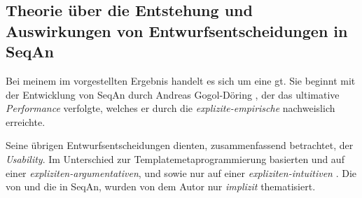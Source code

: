 \subsection{Theorie über die Entstehung und Auswirkungen von Entwurfsentscheidungen in SeqAn}

Bei meinem im  vorgestellten Ergebnis handelt es sich um eine \gls{gt}. Sie beginnt mit der Entwicklung von SeqAn durch Andreas Gogol-Döring \citep{GogolDoring:2009vz}, der das ultimative  \textit{Performance} verfolgte, welches er durch die \textit{explizite-empirische}   nachweislich erreichte.

Seine übrigen Entwurfsentscheidungen dienten, zusammenfassend betrachtet, der \textit{Usability}. Im Unterschied zur Templatemetaprogrammierung basierten  und  auf einer \textit{expliziten-argumentativen}, und  sowie  nur auf einer \textit{expliziten-intuitiven} . Die  von und die  in SeqAn, wurden von dem Autor nur \textit{implizit} thematisiert.

